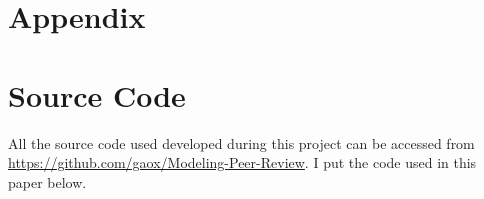\documentclass[11pt]{article}
\begin{document}
\newpage

\section{Appendix}
\appendix
\section{Source Code}
All the source code used developed during this project can be accessed from \url{https://github.com/gaox/Modeling-Peer-Review}. I put the code used in this paper below.



















%
%
%
%
%
%
%
%
\end{document}
